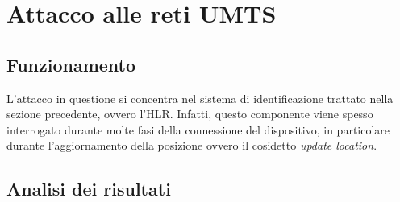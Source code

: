 \section{Attacco alle reti UMTS}
\subsection{Funzionamento}
L'attacco in questione si concentra nel sistema di identificazione trattato nella sezione precedente, ovvero
l'HLR. Infatti, questo componente viene spesso interrogato durante molte fasi della connessione del dispositivo,
 in particolare durante l'aggiornamento della posizione ovvero il cosidetto \textit{update location}.
\subsection{Analisi dei risultati}